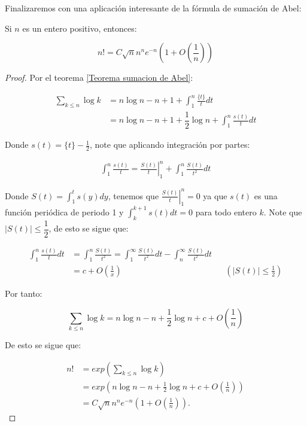 Finalizaremos con una aplicación interesante de la fórmula de sumación de Abel:

\begin{prop}
Si $n$ es un entero positivo, entonces:

$$n!=C \sqrt{n} n^n e^{-n}\left(1+O\left(\frac{1}{n}\right)\right)$$
\end{prop}

\begin{proof}
Por el teorema \ref{Teorema sumacion de Abel}:

\begin{align*}
    \sum_{k\leq n}\log k&=n\log n-n+1+\int_1^n\frac{\{t\}}{t}dt\\
    &=n\log n -n+1+\dfrac{1}{2}\log n+\int_1^n \frac{s(t)}{t}dt
\end{align*}

Donde $s(t)=\{t\}-\frac{1}{2}$, note que aplicando integración por partes:

\begin{align*}
\int_1^n \frac{s(t)}{t}=\left.\frac{S(t)}{t}\right|_1 ^n+\int_1^n \frac{S(t)}{t^2} dt
\end{align*}

Donde $S(t)=\displaystyle\int_1^t s(y)dy$, tenemos que $\displaystyle\left.\frac{S(t)}{t}\right|_1 ^n=0$ ya que $s(t)$ es una función periódica de periodo 1 y $\displaystyle\int_k^{k+1}s(t)dt=0$ para todo entero $k$. Note que $|S(t)|\leq \dfrac{1}{2}$, de esto se sigue que:

\begin{align*}
\int_1^n \frac{s(t)}{t}dt&=\int_1^n\frac{S(t)}{t^2}=\int_1^{\infty}\frac{S(t)}{t^2}dt-\int_n^{\infty}\frac{S(t)}{t^2}dt\\
&=c+O\left(\frac{1}{x}\right) && \left(|S(t)|\leq \frac{1}{2}\right)
\end{align*}

Por tanto:

$$\sum_{k\leq n}\log k=n \log n-n+\frac{1}{2} \log n+c+O\left(\frac{1}{n}\right)$$

De esto se sigue que:

\begin{align*}
    n!&=exp{\displaystyle\left(\sum_{k\leq n}\log k\right)}\\
    &=exp{\displaystyle \left(n \log n-n+\frac{1}{2} \log n+c+O\left(\frac{1}{n}\right)\right)}\\
    &=C\sqrt{n}n^ne^{-n}\left(1+O\left(\frac{1}{n}\right)\right)
.\end{align*}

\end{proof}

